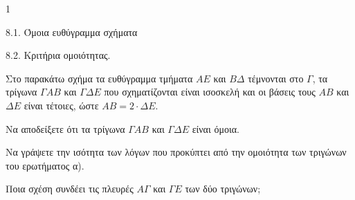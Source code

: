 \begin{ylh}{1}
    \item 8.1. Όμοια ευθύγραμμα σχήματα
    \item 8.2. Κριτήρια ομοιότητας.
\end{ylh}
\begin{figure}
\end{figure}
Στο παρακάτω σχήμα τα ευθύγραμμα τμήματα $AE$ και $B\Delta$ τέμνονται στο $\Gamma$, τα τρίγωνα $\Gamma AB$ και $\Gamma \Delta E$ που σχηματίζονται είναι ισοσκελή και οι βάσεις τους $AB$ και $\Delta E$ είναι τέτοιες, ώστε $AB = 2 \cdot \Delta E$.
\begin{alist}
    \item Να αποδείξετε ότι τα τρίγωνα $\Gamma AB$ και $\Gamma \Delta E$ είναι όμοια. 
    \item
    \begin{rlist}
        \item Να γράψετε την ισότητα των λόγων που προκύπτει από την ομοιότητα των τριγώνων του ερωτήματος α).
        \item Ποια σχέση συνδέει τις πλευρές $A\Gamma$ και $\Gamma E$ των δύο τριγώνων; 
    \end{rlist}
\end{alist}